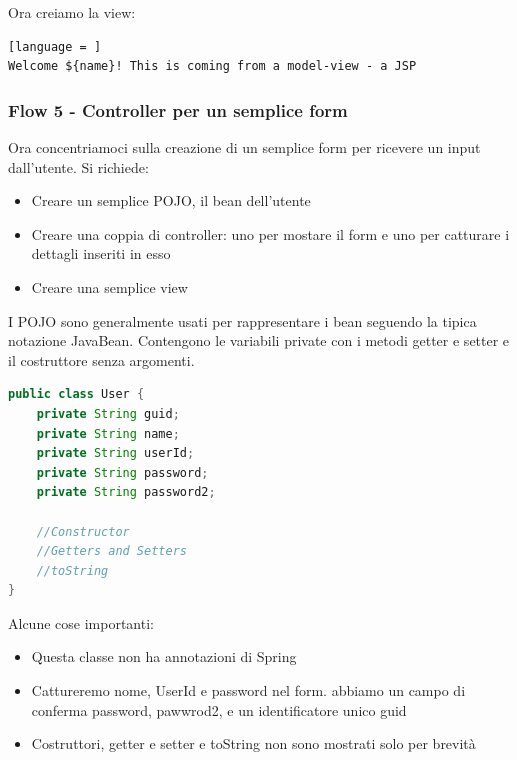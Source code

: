 \documentclass[11pt,a4paper]{book}
\begin{document}
Ora creiamo la view:
\begin{lstlisting}[language = ]
Welcome ${name}! This is coming from a model-view - a JSP
\end{lstlisting}
\subsubsection{Flow 5 - Controller per un semplice form} \label{flow5}
Ora concentriamoci sulla creazione di un semplice form per ricevere un input dall'utente. Si richiede:
\begin{itemize}
	\item Creare un semplice POJO, il bean dell'utente
	\item Creare una coppia di controller: uno per mostare il form e uno per catturare i dettagli inseriti in esso
	\item Creare una semplice view
\end{itemize}
I POJO sono generalmente usati per rappresentare i bean seguendo la tipica notazione JavaBean. Contengono le variabili private con i metodi getter e setter e il costruttore senza argomenti.
\begin{lstlisting}[language = Java]
public class User {
	private String guid;
	private String name;
	private String userId;
	private String password;
	private String password2;

	//Constructor
	//Getters and Setters
	//toString
}
\end{lstlisting}
Alcune cose importanti:
\begin{itemize}
	\item Questa classe non ha annotazioni di Spring
	\item Cattureremo nome, UserId e password nel form. abbiamo un campo di conferma password, pawwrod2, e un identificatore unico guid
	\item Costruttori, getter e setter e toString non sono mostrati solo per brevità
\end{itemize}
\end{document}
